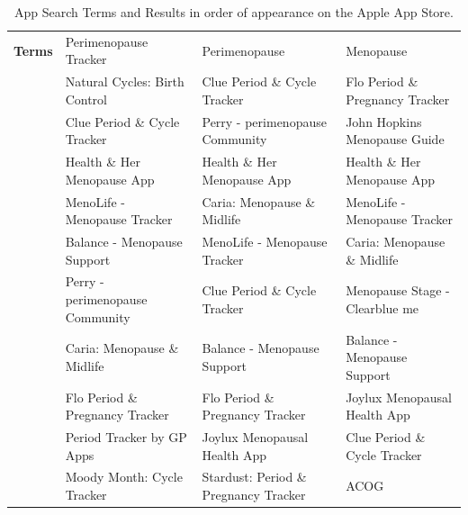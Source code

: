 \begin{table}[h!!]
    \tiny
        \begin{center}
        \caption{App Search Terms and Results in order of appearance on the Apple App Store.}
            \label{table:app-search-terms}
                \begin{tabular}{llll}
                \textbf{Terms} & Perimenopause Tracker           & Perimenopause                         & Menopause                       \\ \cline{2-4} 
                                    & Natural Cycles: Birth Control   & Clue Period \& Cycle Tracker          & Flo Period \& Pregnancy Tracker \\
                                    & Clue Period \& Cycle Tracker    & Perry - perimenopause Community       & John Hopkins Menopause Guide    \\
                                    & Health \& Her Menopause App     & Health \& Her Menopause App           & Health \& Her Menopause App     \\
                                    & MenoLife - Menopause Tracker    & Caria: Menopause \& Midlife           & MenoLife - Menopause Tracker    \\
                                    & Balance - Menopause Support     & MenoLife - Menopause Tracker          & Caria: Menopause \& Midlife     \\
                                    & Perry - perimenopause Community & Clue Period \& Cycle Tracker          & Menopause Stage - Clearblue me  \\
                                    & Caria: Menopause \& Midlife     & Balance - Menopause Support           & Balance - Menopause Support     \\
                                    & Flo Period \& Pregnancy Tracker & Flo Period \& Pregnancy Tracker       & Joylux Menopausal Health App    \\
                                    & Period Tracker by GP Apps       & Joylux Menopausal Health App          & Clue Period \& Cycle Tracker    \\
                                    & Moody Month: Cycle Tracker      & Stardust: Period \& Pregnancy Tracker & ACOG                           
                \end{tabular}
        \end{center}
  \end{table}

 

